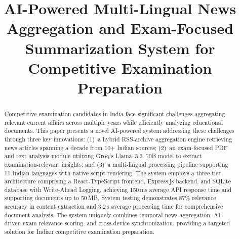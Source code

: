 \documentclass[conference]{IEEEtran}
\begin{document}
\title{AI-Powered Multi-Lingual News Aggregation and Exam-Focused Summarization System for Competitive Examination Preparation}

\author{
  \and
  \and
  \and
}

\maketitle

\begin{abstract}
Competitive examination candidates in India face significant challenges aggregating relevant current affairs across multiple years while efficiently analyzing educational documents. This paper presents a novel AI-powered system addressing these challenges through three key innovations: (1)~a hybrid RSS-archive aggregation engine retrieving news articles spanning a decade from 10+ Indian sources; (2)~an exam-focused PDF and text analysis module utilizing Groq's Llama~3.3~70B model to extract examination-relevant insights; and (3)~a multi-lingual processing pipeline supporting 11 Indian languages with native script rendering. The system employs a three-tier architecture comprising a React-TypeScript frontend, Express.js backend, and SQLite database with Write-Ahead Logging, achieving 150\,ms average API response time and supporting documents up to 50\,MB. System testing demonstrates 87\% relevance accuracy in content extraction and 3.2\,s average processing time for comprehensive document analysis. The system uniquely combines temporal news aggregation, AI-driven exam relevance scoring, and cross-device synchronization, providing a targeted solution for Indian competitive examination preparation.
\end{abstract}
\end{document}

